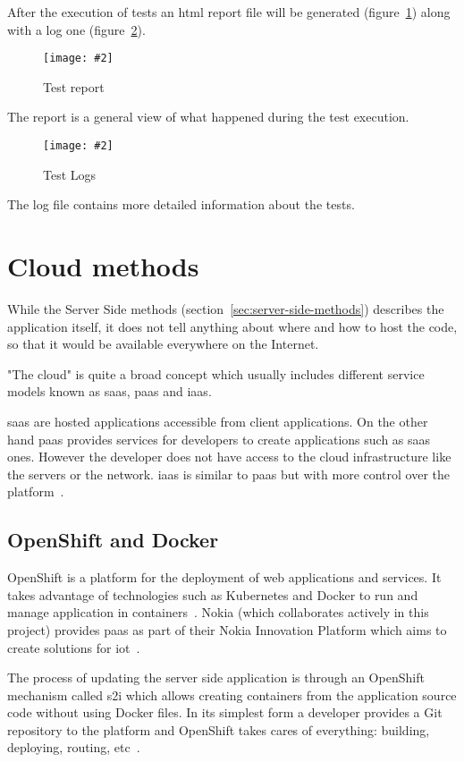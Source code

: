 \documentclass[hidelinks,11pt,a4paper,oneside,article]{memoir}
\newcommand{\putimage}[3][10] %
{
\begin{figure}[h]
	\centering
	\captionsetup{justification=centering}
	\texttt{[image: \#2]}
	\caption{#3}
	\label{fig:#2}
\end{figure}
}
\begin{document}
After the execution of tests an \gls{html} report file will be generated (figure~\ref{fig:test-report}) along with a log one (figure~\ref{fig:test-log}).

    \putimage{test-report}{Test report}
     
The report is a general view of what happened during the test execution.
     
    \putimage{test-log}{Test Logs}
    
The log file contains more detailed information about the tests.



\section{Cloud methods}
While the Server Side methods (section~\ref{sec:server-side-methods}) describes the application itself, it does not tell anything about where and how to host the code, so that it would be available everywhere on the Internet.

"The cloud" is quite a broad concept which usually includes different service models known as \gls{saas}, \gls{paas} and \gls{iaas}. 


 \gls{saas} are hosted applications accessible from client applications. On the other hand \gls{paas}  provides services for developers to create applications such as \gls{saas} ones. However the developer does not have access to the cloud infrastructure like the servers or the network. \gls{iaas} is similar to \gls{paas} but with more control over the platform~\cite{petermelltimothygrance2011}.

\subsection*{OpenShift and Docker}
OpenShift is a platform for the deployment of web applications and services. It takes advantage of technologies such as Kubernetes and Docker to run and manage application in containers~\cite{shipley2016openshift}. Nokia (which collaborates actively in this project) provides \gls{paas} as part of their Nokia Innovation Platform which aims to create solutions for \gls{iot}~\cite{nokiainnovation}.

The process of updating the server side application is through an OpenShift mechanism called \gls{s2i} which allows creating containers from the application source code without using Docker files. In its simplest form a developer provides a Git repository to the platform and OpenShift takes cares of everything: building, deploying, routing, etc~\cite[5]{shipley2016openshift}.
\end{document}
